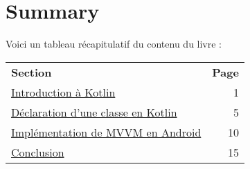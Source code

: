\section*{Summary}\label{sec:summary}
\hypertarget{page:summary}{}
Voici un tableau récapitulatif du contenu du livre :

\begin{tabularx}{\textwidth}{@{}Xr@{}} %
\textbf{Section} & \textbf{Page} \\
\addlinespace[0.5ex] %
\hyperref[sec:intro]{Introduction à Kotlin} \dotfill & 1 \\
\hyperref[sec:classes]{Déclaration d'une classe en Kotlin} \dotfill & 5 \\
\hyperref[sec:mvvm]{Implémentation de MVVM en Android} \dotfill & 10 \\
\hyperref[sec:conclusion]{Conclusion} \dotfill & 15 \\
\end{tabularx}
